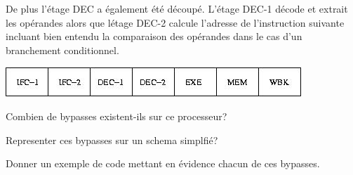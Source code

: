De plus l'\'etage DEC a \'egalement \'et\'e d\'ecoup\'e. L'\'etage
DEC-1 d\'ecode et extrait les op\'erandes alors que l\'etage DEC-2 calcule
l'adresse de l'instruction suivante incluant bien entendu la comparaison
des op\'erandes dans le cas d'un branchement conditionnel.

\begin{center}
  \includegraphics[scale=0.7]{figures/pipeline.jpg}
\end{center}

Combien de bypasses existent-ils sur ce processeur?

Representer ces bypasses sur un schema simplfi\'e?

Donner un exemple de code mettant en \'evidence chacun de ces bypasses.

